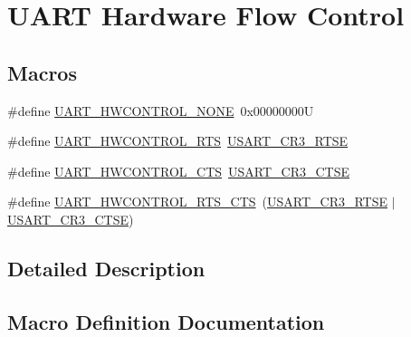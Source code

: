 \hypertarget{group___u_a_r_t___hardware___flow___control}{}\section{U\+A\+RT Hardware Flow Control}
\label{group___u_a_r_t___hardware___flow___control}
\subsection*{Macros}
\begin{DoxyCompactItemize}
\item 
\#define \mbox{\hyperlink{group___u_a_r_t___hardware___flow___control_gae0569001c06b7760cd38c481f84116cf}{U\+A\+R\+T\+\_\+\+H\+W\+C\+O\+N\+T\+R\+O\+L\+\_\+\+N\+O\+NE}}~0x00000000U
\item 
\#define \mbox{\hyperlink{group___u_a_r_t___hardware___flow___control_ga6d5dad09c6abf30f252084ba0f8c0b7d}{U\+A\+R\+T\+\_\+\+H\+W\+C\+O\+N\+T\+R\+O\+L\+\_\+\+R\+TS}}~\mbox{\hyperlink{group___peripheral___registers___bits___definition_ga7c5d6fcd84a4728cda578a0339b4cac2}{U\+S\+A\+R\+T\+\_\+\+C\+R3\+\_\+\+R\+T\+SE}}
\item 
\#define \mbox{\hyperlink{group___u_a_r_t___hardware___flow___control_ga352f517245986e3b86bc75f8472c51ea}{U\+A\+R\+T\+\_\+\+H\+W\+C\+O\+N\+T\+R\+O\+L\+\_\+\+C\+TS}}~\mbox{\hyperlink{group___peripheral___registers___bits___definition_gaa125f026b1ca2d76eab48b191baed265}{U\+S\+A\+R\+T\+\_\+\+C\+R3\+\_\+\+C\+T\+SE}}
\item 
\#define \mbox{\hyperlink{group___u_a_r_t___hardware___flow___control_ga7c91698e8f08ba7ed3f2a0ba9aa27d73}{U\+A\+R\+T\+\_\+\+H\+W\+C\+O\+N\+T\+R\+O\+L\+\_\+\+R\+T\+S\+\_\+\+C\+TS}}~(\mbox{\hyperlink{group___peripheral___registers___bits___definition_ga7c5d6fcd84a4728cda578a0339b4cac2}{U\+S\+A\+R\+T\+\_\+\+C\+R3\+\_\+\+R\+T\+SE}} $\vert$ \mbox{\hyperlink{group___peripheral___registers___bits___definition_gaa125f026b1ca2d76eab48b191baed265}{U\+S\+A\+R\+T\+\_\+\+C\+R3\+\_\+\+C\+T\+SE}})
\end{DoxyCompactItemize}


\subsection{Detailed Description}


\subsection{Macro Definition Documentation}
\mbox{\label{group___u_a_r_t___hardware___flow___control_ga352f517245986e3b86bc75f8472c51ea}} 
